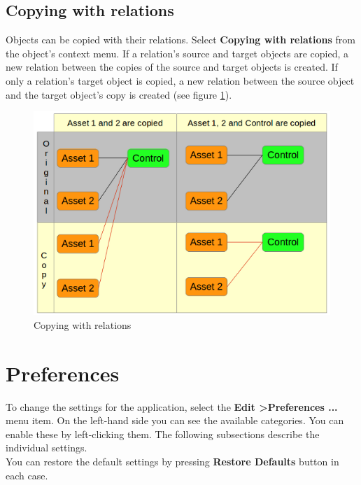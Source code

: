 \documentclass[a4paper,10pt]{book}
\begin{document}
\section{Copying with relations}
Objects can be copied with their relations. Select \textbf{Copying with relations} from the object's context menu.
If a relation's source and target objects are copied, a new relation between the copies of the source and target objects is created. If only a relation's target object is copied, a new relation between the source object and the target object's copy is created (see figure \ref{Copying with relations}).
\begin{figure}[htb!]
  \centering
  \includegraphics[scale=.50]{Screenshot/copy_with_links_en.png}
  \caption{\label{Copying with relations} Copying with relations}
\end{figure}

\chapter{Preferences}
To change the settings for the application, select the
\textbf{Edit \textgreater Preferences ...} menu item. On the left-hand side you can see the available categories. You can enable these by
left-clicking them. The following subsections describe the individual settings.
\newline\\
You can restore the default settings by pressing \textbf{Restore Defaults} button in each case.
\end{document}
